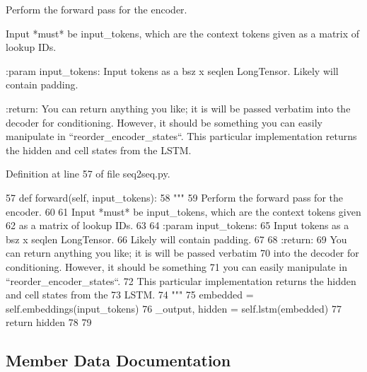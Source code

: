 \begin{DoxyVerb}Perform the forward pass for the encoder.

Input *must* be input_tokens, which are the context tokens given
as a matrix of lookup IDs.

:param input_tokens:
    Input tokens as a bsz x seqlen LongTensor.
    Likely will contain padding.

:return:
    You can return anything you like; it is will be passed verbatim
    into the decoder for conditioning. However, it should be something
    you can easily manipulate in ``reorder_encoder_states``.
    This particular implementation returns the hidden and cell states from the
    LSTM.
\end{DoxyVerb}
 

Definition at line 57 of file seq2seq.\+py.


\begin{DoxyCode}
57     \textcolor{keyword}{def }forward(self, input\_tokens):
58         \textcolor{stringliteral}{"""}
59 \textcolor{stringliteral}{        Perform the forward pass for the encoder.}
60 \textcolor{stringliteral}{}
61 \textcolor{stringliteral}{        Input *must* be input\_tokens, which are the context tokens given}
62 \textcolor{stringliteral}{        as a matrix of lookup IDs.}
63 \textcolor{stringliteral}{}
64 \textcolor{stringliteral}{        :param input\_tokens:}
65 \textcolor{stringliteral}{            Input tokens as a bsz x seqlen LongTensor.}
66 \textcolor{stringliteral}{            Likely will contain padding.}
67 \textcolor{stringliteral}{}
68 \textcolor{stringliteral}{        :return:}
69 \textcolor{stringliteral}{            You can return anything you like; it is will be passed verbatim}
70 \textcolor{stringliteral}{            into the decoder for conditioning. However, it should be something}
71 \textcolor{stringliteral}{            you can easily manipulate in ``reorder\_encoder\_states``.}
72 \textcolor{stringliteral}{            This particular implementation returns the hidden and cell states from the}
73 \textcolor{stringliteral}{            LSTM.}
74 \textcolor{stringliteral}{        """}
75         embedded = self.embeddings(input\_tokens)
76         \_output, hidden = self.lstm(embedded)
77         \textcolor{keywordflow}{return} hidden
78 
79 
\end{DoxyCode}


\subsection{Member Data Documentation}
\mbox{\label{classparlai_1_1agents_1_1examples_1_1seq2seq_1_1Encoder_a424e06ccc9c3aab6726981f738e3b833}} 
